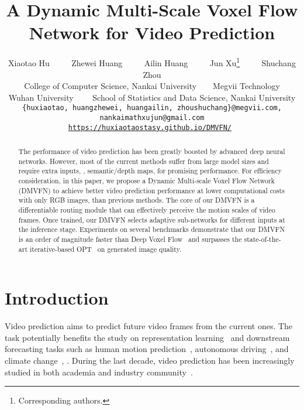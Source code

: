 \documentclass[10pt,twocolumn,letterpaper]{article}
\newcommand*\samethanks[1][\value{footnote}]{\footnotemark[#1]}
\begin{document}
\title{A Dynamic Multi-Scale Voxel Flow Network for Video Prediction}
\author{Xiaotao Hu
		~~~~
		Zhewei Huang
        ~~~~
		Ailin Huang
        ~~~~
            Jun Xu\thanks{Corresponding authors.}
        ~~~~
            Shuchang Zhou\samethanks{}\\
		College of Computer Science, Nankai University~~~~Megvii Technology\\ Wuhan University~~~~
        School of Statistics and Data Science, Nankai University\\
		{\tt\small \{huxiaotao, huangzhewei, huangailin, zhoushuchang\}@megvii.com}\tt\small, nankaimathxujun@gmail.com\\
  \url{https://huxiaotaostasy.github.io/DMVFN/}
	}
	\maketitle
 
\begin{abstract}
The performance of video prediction has been greatly boosted by advanced deep neural networks.
However, most of the current methods suffer from large model sizes and require extra inputs, \eg, semantic/depth maps, for promising performance.
For efficiency consideration, in this paper, we propose a Dynamic Multi-scale Voxel Flow Network (DMVFN) to achieve better video prediction performance at lower computational costs with only RGB images, than previous methods.
The core of our DMVFN is a differentiable routing module that can effectively perceive the motion scales of video frames.
Once trained, our DMVFN selects adaptive sub-networks for different inputs at the inference stage.
Experiments on several benchmarks demonstrate that our DMVFN is an order of magnitude faster than Deep Voxel Flow~\cite{dvf} and surpasses the state-of-the-art iterative-based OPT~\cite{wu2022optimizing} on generated image quality.
\end{abstract}
\section{Introduction}

Video prediction aims to predict future video frames from the current ones. The task potentially benefits the study on representation learning~\cite{oprea2020review} and downstream forecasting tasks such as human motion prediction~\cite{martinez2017human}, autonomous driving~\cite{castrejon2019improved}, and climate change~\cite{shi2015convolutional}, \etc. During the last decade, video prediction has been increasingly studied in both academia and industry community~\cite{chandra2019traphic,byeon2018contextvp}.
\end{document}
